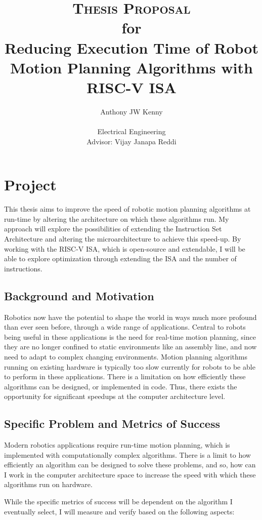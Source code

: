 \documentclass[11pt, oneside]{article}   	%
\title{\textsc{Thesis Proposal} \\ 
	\small{for} \\ 
	\Large{Reducing Execution Time of Robot Motion Planning Algorithms with RISC-V ISA}}
\author{Anthony JW Kenny \\ \\
        Electrical Engineering \\
        Advisor: Vijay Janapa Reddi}
\begin{document}
\maketitle




\section{Project}
This thesis aims to improve the speed of robotic motion planning algorithms at run-time by altering the architecture on which these algorithms run. My approach will explore the possibilities of extending the Instruction Set Architecture and altering the microarchitecture to achieve this speed-up. By working with the RISC-V ISA, which is open-source and extendable, I will be able to explore optimization through extending the ISA and the number of instructions.

\subsection{Background and Motivation}
Robotics now have the potential to shape the world in ways much more profound than ever seen before, through a wide range of applications. Central to robots being useful in these applications is the need for real-time motion planning, since they are no longer confined to static environments like an assembly line, and now need to adapt to complex changing environments. Motion planning algorithms running on existing hardware is typically too slow currently for robots to be able to perform in these applications. There is a limitation on how efficiently these algorithms can be designed, or implemented in code. Thus, there exists the opportunity for significant speedups at the computer architecture level. 

\subsection{Specific Problem and Metrics of Success}
Modern robotics applications require run-time motion planning, which is implemented with computationally complex algorithms. There is a limit to how efficiently an algorithm can be designed to solve these problems, and so, how can I work in the computer architecture space to increase the speed with which these algorithms run on hardware.

While the specific metrics of success will be dependent on the algorithm I eventually select, I will measure and verify based on the following aspects:
\end{document}
